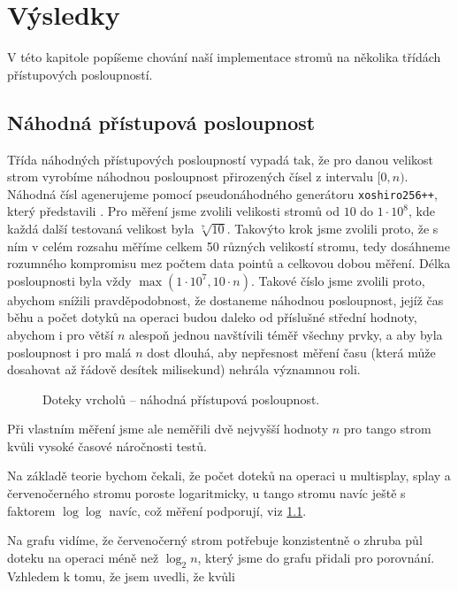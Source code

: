 \chapter{Výsledky}

V této kapitole popíšeme chování naší implementace stromů na několika třídách přístupových posloupností.

\section{Náhodná přístupová posloupnost}

Třída náhodných přístupových posloupností vypadá tak, že pro danou velikost
strom vyrobíme náhodnou posloupnost přirozených čísel z intervalu $[0,n)$.
Náhodná čísl agenerujeme pomocí pseudonáhodného generátoru {\tt xoshiro256++},
který představili \citet{xoshiro}. Pro měření jsme zvolili velikosti stromů od $10$ do $1\cdot
10^8$, kde každá další testovaná velikost byla $\sqrt[7]{10}$. Takovýto krok
jsme zvolili proto, že s ním v celém rozsahu měříme celkem 50 různých velikostí
stromu, tedy dosáhneme rozumného kompromisu mez počtem data pointů a celkovou
dobou měření. Délka posloupnosti byla vždy $\max(1\cdot10^7, 10\cdot n)$.
Takové číslo jsme zvolili proto, abychom snížili pravděpodobnost, že dostaneme
náhodnou posloupnost, jejíž čas běhu a počet dotyků na operaci budou daleko od
příslušné střední hodnoty, abychom i pro větší $n$ alespoň jednou navštívili
téměř všechny prvky, a aby byla posloupnost i pro malá $n$ dost dlouhá, aby
nepřesnost měření času (která může dosahovat až řádově desítek milisekund)
nehrála významnou roli. 

\def\graphfigure#1#2{
\begin{figure}[h!]
\centering
\caption{#2}
\label{obr:#1}
\end{figure}
}

\graphfigure{touch_r}{Doteky vrcholů -- náhodná přístupová posloupnost.}


Při vlastním měření jsme ale neměřili dvě nejvyšší hodnoty $n$ pro tango strom kvůli vysoké časové náročnosti testů.

Na základě teorie bychom čekali, že počet doteků na operaci u multisplay, splay a červenočerného stromu poroste logaritmicky, u tango stromu navíc ještě s faktorem $\log\log$ navíc, což měření podporují, viz \ref{obr:touch_r}.
\let\oldlog\log
\def\log{\oldlog_2}

Na grafu vidíme, že červenočerný strom potřebuje konzistentně o zhruba
půl doteku na operaci méně než $\log n$, který jsme do grafu přidali pro
porovnání. Vzhledem k tomu, že jsem uvedli, že kvůli %


